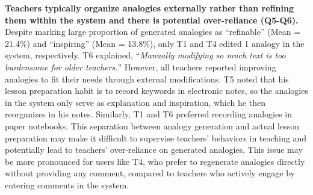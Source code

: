 \textbf{Teachers typically organize analogies externally rather than refining them within the system and there is potential over-reliance (Q5-Q6).}
Despite marking large proportion of generated analogies as ``refinable'' (Mean = 21.4\%) and ``inspiring'' (Mean = 13.8\%), only T1 and T4 edited 1 analogy in the system, respectively. 
T6 explained, ``\textit{Manually modifying so much text is too burdensome for older teachers.}'' 
However, all teachers reported improving analogies to fit their needs through external modifications.
T5 noted that his lesson preparation habit is to record keywords in electronic notes, so the analogies in the system only serve as explanation and inspiration, which he then reorganizes in his notes.
Similarly, T1 and T6 preferred recording analogies in paper notebooks. 
This separation between analogy generation and actual lesson preparation may make it difficult to supervise teachers’ behaviors in teaching and potentially lead to teachers' over-reliance on generated analogies.
This issue may be more pronounced for users like T4, who prefer to regenerate analogies directly without providing any comment, compared to teachers who actively engage by entering comments in the system.
